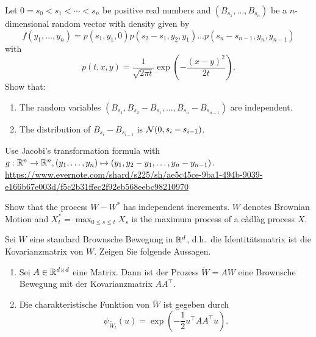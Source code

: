 Let $0=s_0 < s_1 < \cdots < s_n$ be positive real numbers and $(B_{s_{1}},\dots ,B_{s_n})$ 
be a $n$-dimensional random vector with density given by
\begin{equation*}
    f(y_1,\dots ,y_n) = p(s_1, y_1, 0)p(s_2-s_1,y_2, y_1)\dots p(s_n-s_{n-1}, y_n, y_{n-1})
\end{equation*}
with 
\begin{equation*}
    p(t, x,y ) = \frac{1}{\sqrt{2\pi t}} \exp(-\frac{(x-y)^2}{2t}). 
\end{equation*}
Show that:
\begin{enumerate}
    \item The random variables $(B_{s_1}, B_{s_2}-B_{s_1},\dots ,B_{s_n}-B_{s_{n-1}})$ 
        are independent.
    \item The distribution of $B_{s_i}-B_{s_{i-1}}$ is $\mathcal N(0, s_{i}-s_{i-1})$.
\end{enumerate}

\solution Use Jacobi's transformation formula with
$g:\mathbb R^{n}\to\mathbb R^{n}, (y_1,\dots ,y_n)\mapsto(y_1, y_2-y_1,\dots
,y_n-y_{n-1})$. 
\url{https://www.evernote.com/shard/s225/sh/ae5c45ce-9ba1-494b-9039-e166b67e003d/f5c2b31ffec2f92eb568eebc98210970}


 Show that the process $W
- W^*$ has independent increments. $W$ denotes Brownian Motion and $X^*_t=
\max_{0 \leq s \leq t} X_s$ is the maximum process of a c\`adl\`ag process $X$.


Sei $W$ eine standard Brownsche Bewegung in $\mathbb R^d$, d.h.\ die Identitätsmatrix
ist die Kovarianzmatrix von $W$. Zeigen Sie folgende Aussagen. 
\begin{enumerate}
    \item Sei $A\in \mathbb R^{d \times d}$ eine Matrix. Dann ist der Prozess $\tilde W = AW$ eine
        Brownsche Bewegung mit der Kovarianzmatrix $A A^{\top}$. 
    \item Die charakteristische Funktion von $\tilde W$ ist gegeben durch
        \begin{equation*}
            \psi_{\tilde W_t} (u) = \exp \left( -\frac{1}{2} u^{\top} A A^{\top} u \right).
        \end{equation*}
\end{enumerate}

